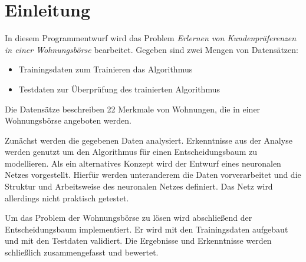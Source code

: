 \section{Einleitung}\label{sec:einleitung}
In diesem Programmentwurf wird das Problem \emph{Erlernen von Kundenpräferenzen in einer Wohnungsbörse}
bearbeitet. Gegeben sind zwei Mengen von Datensätzen:
\begin{itemize}
    \item Trainingsdaten zum Trainieren das Algorithmus
    \item Testdaten zur Überprüfung des trainierten Algorithmus
\end{itemize}

Die Datensätze beschreiben 22 Merkmale von Wohnungen,
die in einer Wohnungsbörse angeboten werden.

Zunächst werden die gegebenen Daten analysiert.
Erkenntnisse aus der Analyse werden genutzt um den Algorithmus für einen Entscheidungsbaum zu modellieren.
Als ein alternatives Konzept wird der Entwurf eines neuronalen Netzes vorgestellt.
Hierfür werden unteranderem die Daten vorverarbeitet und die Struktur und Arbeitsweise des neuronalen Netzes definiert.
Das Netz wird allerdings nicht praktisch getestet.

Um das Problem der Wohnungsbörse zu lösen wird abschließend der Entscheidungsbaum implementiert.
Er wird mit den Trainingsdaten aufgebaut und mit den Testdaten validiert.
Die Ergebnisse und Erkenntnisse werden schließlich zusammengefasst und bewertet.
